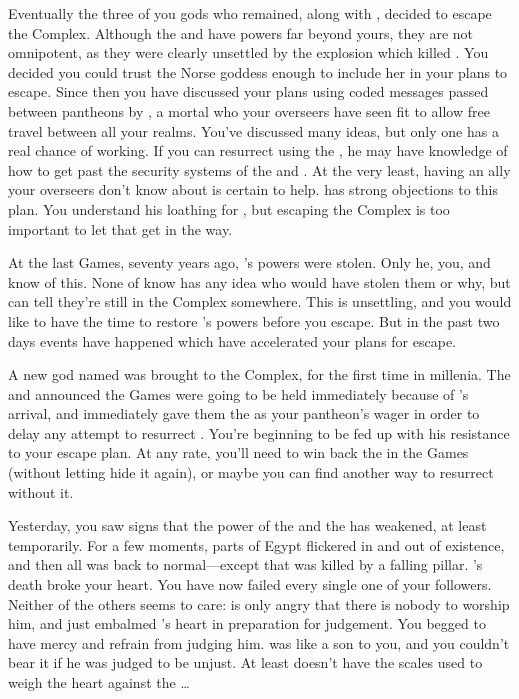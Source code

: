 \documentclass[char]{guardians}
\begin{document}
Eventually the three of you gods who remained, along with \cEgyptianHuman{}, decided to escape the Complex. Although the \cWarden{} and \cCaretaker{} have powers far beyond yours, they are not omnipotent, as they were clearly unsettled by the explosion which killed \cSet{}. You decided you could trust the Norse goddess \cHel{} enough to include her in your plans to escape. Since then you have discussed your plans using coded messages passed between pantheons by \cJascha{}, a mortal who your overseers have seen fit to allow free travel between all your realms. You've discussed many ideas, but only one has a real chance of working. If you can resurrect \cSet{} using the \iNecro{\MYname}, he may have knowledge of how to get past the security systems of the \cWarden{} and \cCaretaker{}. At the very least, having an ally your overseers don't know about is certain to help. \cOsiris{} has strong objections to this plan. You understand his loathing for \cSet{}, but escaping the Complex is too important to let that get in the way.


At the last Games, seventy years ago, \cOsiris{}'s powers were stolen. Only he, you, and \cAnubis{} know of this. None of know has any idea who would have stolen them or why, but \cOsiris{} can tell they're still in the Complex somewhere. This is unsettling, and you would like to have the time to restore \cOsiris{}'s powers before you escape. But in the past two days events have happened which have accelerated your plans for escape.

A new god named \cUnity{} was brought to the Complex, for the first time in millenia. The \cWarden{} and \cCaretaker{} announced the Games were going to be held immediately because of \cUnity{}'s arrival, and \cOsiris{} immediately gave them the \iNecro{\MYname} as your pantheon's wager in order to delay any attempt to resurrect \cSet{}. You're beginning to be fed up with his resistance to your escape plan. At any rate, you'll need to win back the \iNecro{\MYname} in the Games (without letting \cOsiris{} hide it again), or maybe you can find another way to resurrect \cSet{} without it.

Yesterday, you saw signs that the power of the \cWarden{} and the \cCaretaker{} has weakened, at least temporarily. For a few moments, parts of Egypt flickered in and out of existence, and then all was back to normal---except that \cEgyptianHuman{} was killed by a falling pillar. \cEgyptianHuman{}'s death broke your heart. You have now failed every single one of your followers. Neither of the others seems to care: \cOsiris{} is only angry that there is nobody to worship him, and \cAnubis{} just embalmed \cEgyptianHuman{}'s heart in preparation for judgement. You begged \cAnubis{} to have mercy and refrain from judging him. \cEgyptianHuman{} was like a son to you, and you couldn't bear it if he was judged to be unjust. At least \cAnubis{} doesn't have the scales used to weigh the heart against the \iFeather{\MYname}\ldots{}
\end{document}
